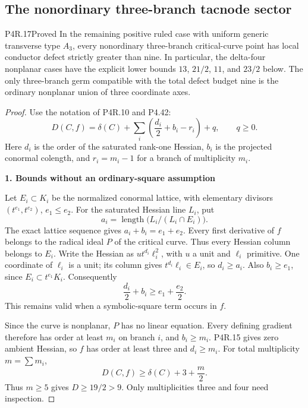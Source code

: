 \subsection{The nonordinary three-branch tacnode sector}

\begin{statement}{P4R.17}{Proved}
In the remaining positive ruled case with uniform generic transverse
type $A_3$, every nonordinary three-branch critical-curve point has
local conductor defect strictly greater than nine. In particular,
the delta-four nonplanar cases have the explicit lower bounds
$13$, $21/2$, $11$, and $23/2$ below. The only three-branch germ
compatible with the total defect budget nine is the ordinary
nonplanar union of three coordinate axes.
\end{statement}
\begin{proof}
Use the notation of P4R.10 and P4.42: \[
 D(C,f)=\delta(C)+
        \sum_i\left(\frac{d_i}{2}+b_i-r_i\right)+q,\qquad q\ge0.
\] Here \(d_i\) is the order of the saturated rank-one Hessian, \(b_i\) is the projected conormal colength, and \(r_i=m_i-1\) for a branch of multiplicity \(m_i\).

\par\medskip\noindent\textbf{1. Bounds without an ordinary-square assumption}\par\label{bounds-without-an-ordinary-square-assumption}

Let \(E_i\subset K_i\) be the normalized conormal lattice, with elementary divisors \((t^{e_1},t^{e_2})\), \(e_1\le e_2\). For the saturated Hessian line \(L_i\), put \[
 a_i=\operatorname{length}\bigl(L_i/(L_i\cap E_i)\bigr).
\] The exact lattice sequence gives \(a_i+b_i=e_1+e_2\). Every first derivative of \(f\) belongs to the radical ideal \(P\) of the critical curve. Thus every Hessian column belongs to \(E_i\). Write the Hessian as \(ut^{d_i}\ell_i^2\), with \(u\) a unit and \(\ell_i\) primitive. One coordinate of \(\ell_i\) is a unit; its column gives \(t^{d_i}\ell_i\in E_i\), so \(d_i\ge a_i\). Also \(b_i\ge e_1\), since \(E_i\subset t^{e_1}K_i\). Consequently \[
                  \frac{d_i}{2}+b_i
                    \ge e_1+\frac{e_2}{2}.           \tag{A}
\] This remains valid when a symbolic-square term occurs in \(f\).

Since the curve is nonplanar, \(P\) has no linear equation. Every defining gradient therefore has order at least \(m_i\) on branch \(i\), and \(b_i\ge m_i\). P4R.15 gives zero ambient Hessian, so \(f\) has order at least three and \(d_i\ge m_i\). For total multiplicity \(m=\sum m_i\), \[
                  D(C,f)\ge\delta(C)+3+\frac m2.       \tag{B}
\] Thus \(m\ge5\) gives \(D\ge19/2>9\). Only multiplicities three and four need inspection.


\end{proof}
